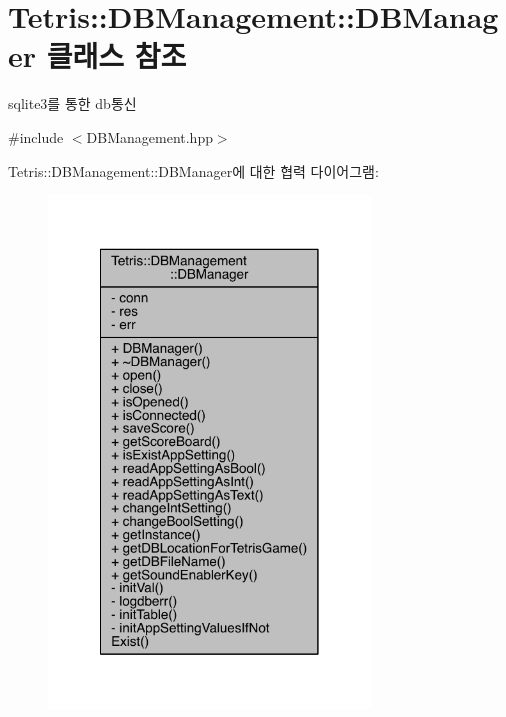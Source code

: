 \hypertarget{class_tetris_1_1_d_b_management_1_1_d_b_manager}{}\section{Tetris\+:\+:D\+B\+Management\+:\+:D\+B\+Manager 클래스 참조}
\label{class_tetris_1_1_d_b_management_1_1_d_b_manager}


sqlite3를 통한 db통신  




{\ttfamily \#include $<$D\+B\+Management.\+hpp$>$}



Tetris\+:\+:D\+B\+Management\+:\+:D\+B\+Manager에 대한 협력 다이어그램\+:
\nopagebreak
\begin{figure}[H]
\begin{center}
\leavevmode
\includegraphics[width=242pt]{d2/d52/class_tetris_1_1_d_b_management_1_1_d_b_manager__coll__graph}
\end{center}
\end{figure}
